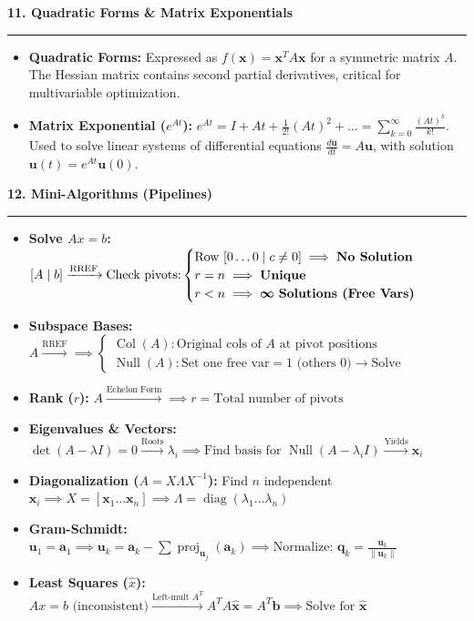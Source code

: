 \documentclass[10pt, landscape, twocolumn]{article}
\newcommand{\cheatsheetsection}[1]{
    \vspace{0.6em}
    {\color{themeblue}\large\bfseries #1} \par
    \vspace{-0.5em}
    {\color{themeblue}\rule{\linewidth}{1pt}} \par
    \vspace{0.2em}
}
\begin{document}
\cheatsheetsection{11. Quadratic Forms \& Matrix Exponentials}
\begin{itemize}[leftmargin=*, itemsep=4pt, parsep=0pt]
    \item \textbf{Quadratic Forms:} Expressed as $f(\mathbf{x}) = \mathbf{x}^T A \mathbf{x}$ for a symmetric matrix $A$. The Hessian matrix contains second partial derivatives, critical for multivariable optimization.
    \item \textbf{Matrix Exponential ($e^{At}$):} $e^{At} = I + At + \frac{1}{2!}(At)^2 + \dots = \sum_{k=0}^{\infty} \frac{(At)^k}{k!}$. Used to solve linear systems of differential equations $\frac{d\mathbf{u}}{dt} = A\mathbf{u}$, with solution $\mathbf{u}(t) = e^{At}\mathbf{u}(0)$.
\end{itemize}

\newpage
\cheatsheetsection{12. Mini-Algorithms (Pipelines)}
\begin{itemize}[leftmargin=*, itemsep=4pt, parsep=0pt]
    \item \textbf{Solve $Ax = b$:} $[A \mid b] \xrightarrow{\text{RREF}} \text{Check pivots:} \begin{cases} \text{Row } [0\dots0 \mid c\neq0] \implies \text{\textbf{No Solution}} \\ r = n \implies \text{\textbf{Unique}} \\ r < n \implies \boldsymbol{\infty} \text{ \textbf{Solutions (Free Vars)}} \end{cases}$
    \item \textbf{Subspace Bases:} $A \xrightarrow{\text{RREF}} \implies \begin{cases} \operatorname{Col}(A): \text{Original cols of } A \text{ at pivot positions} \\ \operatorname{Null}(A): \text{Set one free var}=1 \text{ (others } 0) \to \text{Solve} \end{cases}$
    \item \textbf{Rank ($r$):} $A \xrightarrow{\text{Echelon Form}} \implies r = \text{Total number of pivots}$
    \item \textbf{Eigenvalues \& Vectors:} $\det(A-\lambda I)=0 \xrightarrow{\text{Roots}} \lambda_i \implies \text{Find basis for } \operatorname{Null}(A-\lambda_i I) \xrightarrow{\text{Yields}} \mathbf{x}_i$
    \item \textbf{Diagonalization ($A=X\Lambda X^{-1}$):} Find $n$ independent $\mathbf{x}_i \implies X = [\mathbf{x}_1 \dots \mathbf{x}_n] \implies \Lambda = \operatorname{diag}(\lambda_1 \dots \lambda_n)$
    \item \textbf{Gram-Schmidt:} $\mathbf{u}_1 = \mathbf{a}_1 \implies \mathbf{u}_k = \mathbf{a}_k - \sum \operatorname{proj}_{\mathbf{u}_j}(\mathbf{a}_k) \implies \text{Normalize: } \mathbf{q}_k = \frac{\mathbf{u}_k}{\|\mathbf{u}_k\|}$
    \item \textbf{Least Squares ($\hat{x}$):} $Ax=b \text{ (inconsistent)} \xrightarrow{\text{Left-mult } A^T} A^TA\hat{\mathbf{x}} = A^T\mathbf{b} \implies \text{Solve for } \hat{\mathbf{x}}$
\end{itemize}
\end{document}
